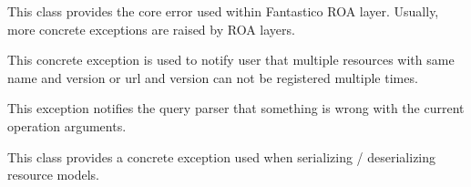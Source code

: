 \documentclass[letterpaper,10pt,english]{sphinxmanual}
\begin{document}
\begin{fulllineitems}
\label{features/roa/technical_summary:fantastico.roa.roa_exceptions.FantasticoRoaError}
This class provides the core error used within Fantastico ROA layer. Usually, more concrete exceptions are raised by
ROA layers.

\end{fulllineitems}


\begin{fulllineitems}
\label{features/roa/technical_summary:fantastico.roa.roa_exceptions.FantasticoRoaDuplicateError}
This concrete exception is used to notify user that multiple resources with same name and version or url and version
can not be registered multiple times.

\end{fulllineitems}


\begin{fulllineitems}
\label{features/roa/technical_summary:fantastico.roa.query_parser_exceptions.QueryParserOperationInvalidError}
This exception notifies the query parser that something is wrong with the current operation arguments.

\end{fulllineitems}


\begin{fulllineitems}
\label{features/roa/technical_summary:fantastico.roa.resource_json_serializer_exceptions.ResourceJsonSerializerError}
This class provides a concrete exception used when serializing / deserializing resource models.

\end{fulllineitems}
\end{document}
